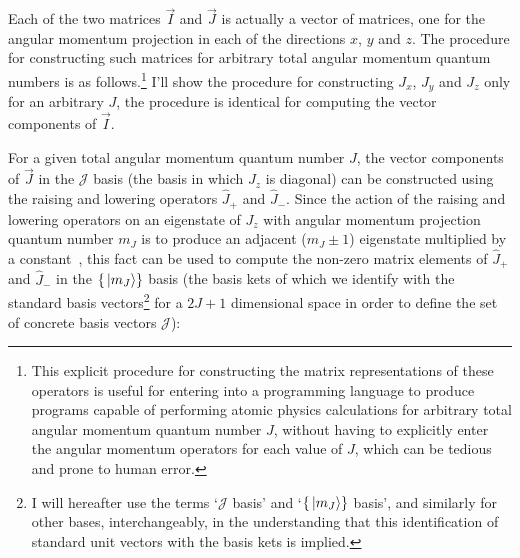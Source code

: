 Each of the two matrices $\vec I$ and $\vec J$ is actually a vector of matrices, one for the angular momentum projection in each of the directions $x$, $y$ and $z$. The procedure for constructing such matrices for arbitrary total angular momentum quantum numbers is as follows.\footnote{This explicit procedure for constructing the matrix representations of these operators is useful for entering into a programming language to produce programs capable of performing atomic physics calculations for arbitrary total angular momentum quantum number $J$, without having to explicitly enter the angular momentum operators for each value of $J$, which can be tedious and prone to human error.} I'll show the procedure for constructing $J_x$, $J_y$ and $J_z$ only for an arbitrary $J$, the procedure is identical for computing the vector components of $\vec I$.

For a given total angular momentum quantum number $J$, the vector components of $\vec J$ in the $\mathcal{J}$ basis (the basis in which $J_z$ is diagonal) can be constructed using the raising and lowering operators $\hat J_+$ and $\hat J_-$. Since the action of the raising and lowering operators on an eigenstate of $J_z$ with angular momentum projection quantum number $m_J$ is to produce an adjacent ($m_J \pm 1$) eigenstate multiplied by a constant~\cite[p 192]{sakurai_modern_1994}, this fact can be used to compute the non-zero matrix elements of $\hat J_+$ and $\hat J_-$ in the $\{\ket{m_J}\}$ basis (the basis kets of which we identify with the standard basis vectors\footnote{I will hereafter use the terms `$\mathcal{J}$ basis' and `$\{\ket{m_J}\}$ basis', and similarly for other bases, interchangeably, in the understanding that this identification of standard unit vectors with the basis kets is implied.} for a $2J+1$ dimensional space in order to define the set of concrete basis vectors $\mathcal{J}$):

